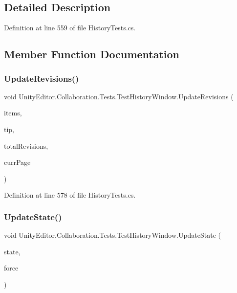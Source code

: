 \subsection{Detailed Description}


Definition at line 559 of file History\+Tests.\+cs.



\subsection{Member Function Documentation}
\mbox{\label{class_unity_editor_1_1_collaboration_1_1_tests_1_1_test_history_window_a03d65448ca22f7bf170d4ef0673b48cc}} 
\subsubsection{\texorpdfstring{UpdateRevisions()}{UpdateRevisions()}}
{\footnotesize\ttfamily void Unity\+Editor.\+Collaboration.\+Tests.\+Test\+History\+Window.\+Update\+Revisions (\begin{DoxyParamCaption}\item[{I\+Enumerable$<$ Revision\+Data $>$}]{items,  }\item[{string}]{tip,  }\item[{int}]{total\+Revisions,  }\item[{int}]{curr\+Page }\end{DoxyParamCaption})}



Definition at line 578 of file History\+Tests.\+cs.

\mbox{\label{class_unity_editor_1_1_collaboration_1_1_tests_1_1_test_history_window_ae36c3e34b7ea55f9142251ff4fc0a7db}} 
\subsubsection{\texorpdfstring{UpdateState()}{UpdateState()}}
{\footnotesize\ttfamily void Unity\+Editor.\+Collaboration.\+Tests.\+Test\+History\+Window.\+Update\+State (\begin{DoxyParamCaption}\item[{History\+State}]{state,  }\item[{bool}]{force }\end{DoxyParamCaption})}



